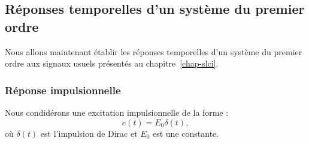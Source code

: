 \subsection{Réponses temporelles d'un système du premier ordre}
Nous allons maintenant établir les réponses temporelles d'un système 
du premier ordre aux signaux usuels présentés au chapitre~\cref{chap-slci}.
\subsubsection{Réponse impulsionnelle}
Nous condidérons une excitation impulsionnelle de la forme :
\[
e(t)=E_0\delta(t),
\]
où $\delta(t)$ est l'impulsion de Dirac et $E_0$ est une constante.

